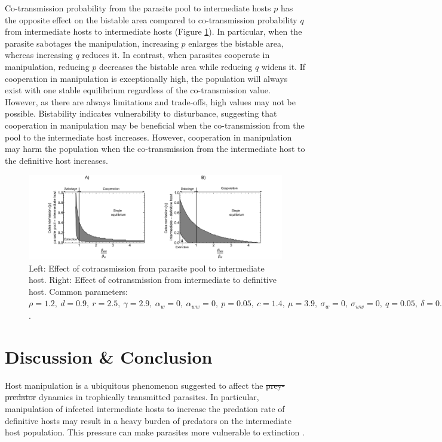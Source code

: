 \documentclass[a4paper]{scrartcl}
\providecommand{\DIFaddtex}[1]{{\protect\color{blue}\uwave{#1}}} %
\providecommand{\DIFdeltex}[1]{{\protect\color{red}\sout{#1}}}                      %
\providecommand{\DIFaddbegin}{} %
\providecommand{\DIFaddend}{} %
\providecommand{\DIFdelbegin}{} %
\providecommand{\DIFdelend}{} %
\providecommand{\DIFadd}[1]{\texorpdfstring{\DIFaddtex{#1}}{#1}} %
\providecommand{\DIFdel}[1]{\texorpdfstring{\DIFdeltex{#1}}{}} %
\newcommand{\DIFscaledelfig}{0.5}
\newlength{\DIFdelgraphicswidth} %
\newlength{\DIFdelgraphicsheight} %
\newcommand{\DIFaddincludegraphics}[2][]{{\color{blue}\fbox{\DIFOincludegraphics[#1]{#2}}}} %
\newcommand{\DIFdelincludegraphics}[2][]{%
\sbox{\DIFdelgraphicsbox}{\DIFOincludegraphics[#1]{#2}}%
\settoboxwidth{\DIFdelgraphicswidth}{\DIFdelgraphicsbox} %
\settoboxtotalheight{\DIFdelgraphicsheight}{\DIFdelgraphicsbox} %
\scalebox{\DIFscaledelfig}{%
\parbox[b]{\DIFdelgraphicswidth}{\usebox{\DIFdelgraphicsbox}\\[-\baselineskip] \rule{\DIFdelgraphicswidth}{0em}}\llap{\resizebox{\DIFdelgraphicswidth}{\DIFdelgraphicsheight}{%
\setlength{\unitlength}{\DIFdelgraphicswidth}%
\begin{picture}(1,1)%
\thicklines\linethickness{2pt} %
{\color[rgb]{1,0,0}\put(0,0){\framebox(1,1){}}}%
{\color[rgb]{1,0,0}\put(0,0){\line( 1,1){1}}}%
{\color[rgb]{1,0,0}\put(0,1){\line(1,-1){1}}}%
\end{picture}%
}\hspace*{3pt}}} %
} %
\DeclareRobustCommand{\DIFaddbegin}{\DIFOaddbegin \let\includegraphics\DIFaddincludegraphics} %
\DeclareRobustCommand{\DIFaddend}{\DIFOaddend \let\includegraphics\DIFOincludegraphics} %
\DeclareRobustCommand{\DIFdelbegin}{\DIFOdelbegin \let\includegraphics\DIFdelincludegraphics} %
\DeclareRobustCommand{\DIFdelend}{\DIFOaddend \let\includegraphics\DIFOincludegraphics} %
\begin{document}
Co-transmission probability from the parasite pool to intermediate hosts $p$ has the opposite effect on the bistable area compared to co-transmission probability $q$ from intermediate hosts to intermediate hosts (Figure \ref{fig:contransmission}). 
In particular, when the parasite sabotages the manipulation, increasing $p$ enlarges the bistable area, whereas increasing $q$ reduces it. 
In contrast, when parasites cooperate in manipulation, reducing $p$ decreases the bistable area while reducing $q$ widens it.  
If cooperation in manipulation is exceptionally high, the population will always exist with one stable equilibrium regardless of the co-transmission value.
However, as there are always limitations and trade-offs, high values may not be possible.
Bistability indicates vulnerability to disturbance, suggesting that cooperation in manipulation may be beneficial when the co-transmission from the pool to the intermediate host increases. 
However, cooperation in manipulation may harm the population when the co-transmission from the intermediate host to the definitive host increases.

\begin{figure}[!ht]
	\captionsetup{format=plain}
	\centering
	\includegraphics[width=\textwidth]{Figures/coinfect_transmission.pdf}
	\caption{Left: Effect of cotransmission from parasite pool to intermediate host. Right: Effect of cotransmission from intermediate to definitive host. Common parameters:  $\rho = 1.2, \ d = 0.9, \ r = 2.5, \ \gamma = 2.9, \ \alpha_w = 0, \ \alpha_{ww} = 0, \ p = 0.05, \ c = 1.4, \ \mu = 3.9, \ \sigma_w = 0, \ \sigma_{ww} = 0, \ q = 0.05, \ \delta = 0.9, \ k = 0.26, \ \epsilon = 4.5, \ \beta_w = 1.45, \ f_w = 38, \ h = 0.6$.}
	\label{fig:contransmission}
\end{figure}

\section*{Discussion \& Conclusion}
Host manipulation is a ubiquitous phenomenon suggested to affect the \DIFdelbegin \DIFdel{prey-predator }\DIFdelend \DIFaddbegin \DIFadd{predator-prey }\DIFaddend dynamics in trophically transmitted parasites. 
In particular, manipulation of infected intermediate hosts to increase the predation rate of definitive hosts may result in a heavy burden of predators on the intermediate host population.
This pressure can make parasites more vulnerable to extinction \citep{Hadeler1989,Fenton2006}. 
\end{document}
